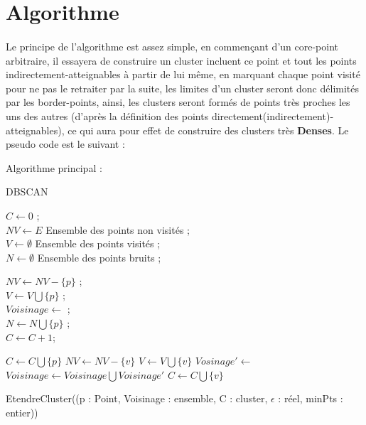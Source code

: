 \section{Algorithme}
	\paragraph{}
		Le principe de l'algorithme est assez simple, en commençant d'un core-point arbitraire, il essayera de construire un cluster incluent ce point et tout les points indirectement-atteignables à partir de lui même, en marquant chaque point visité pour ne pas le retraiter par la suite, les limites d'un cluster seront donc délimités par les border-points, ainsi, les clusters seront formés de points très proches les uns des autres (d'après la définition des points directement(indirectement)-atteignables), ce qui aura pour effet de construire des clusters très \textbf{Denses}. Le pseudo code est le suivant : 
		\par 
		Algorithme principal : \\
		\begin{algorithm}[H]
			\caption{DBSCAN}
			
			$C \gets 0 $ ;\\
			$NV \gets E$ Ensemble des points non visités ;\\
			$V \gets \emptyset$ Ensemble des points visités ;\\
			$N \gets \emptyset $ Ensemble des points bruits ;\\
			{
				$NV \gets NV -\lbrace p \rbrace$ ;\\
				$V \gets V  \bigcup \lbrace p \rbrace$ ;\\
				$Voisinage \gets $  ;\\
				{
					$N \gets N \bigcup \lbrace p \rbrace$ ;\\
				}
				{
					$C \gets C + 1 $;\\
				}
				
			}
		\end{algorithm}
		
		\begin{procedure}[H]
			
			$C \gets C \bigcup \lbrace p \rbrace$ \;
			{
				{
					$NV \gets NV -\lbrace v \rbrace$ \;
					$V \gets V  \bigcup \lbrace v \rbrace$ \;
					$Vosinage \prime \gets $ \;
					{
						$Voisinage \gets Voisinage \bigcup Voisinage \prime $\;
					}
				}
				{
					$C \gets C \bigcup \lbrace v \rbrace$ \;
				}
			}
			\caption{EtendreCluster((p : Point, Voisinage : ensemble, C : cluster, $\epsilon$ : réel, minPts : entier))}
		\end{procedure}
		
